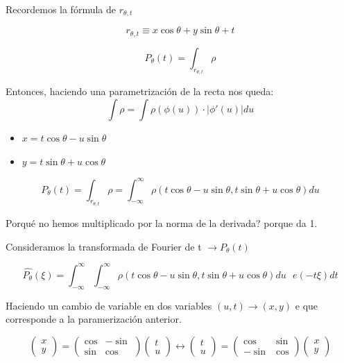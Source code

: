 Recordemos la fórmula de $r_{\theta,t}$

	$$r_{\theta , t} \equiv x \cos\theta + y\sin\theta + t$$

	$$P_{\theta} (t) = \int_{r_{\theta , t}} \rho $$

	Entonces, haciendo una parametrización de la recta nos queda:
	$$\int \rho = \int \rho (\phi(u)) \cdot |\phi '(u)| du$$
	\begin{itemize}
		\item $x = t\cos\theta - u \sin\theta$
		\item $y = t\sin\theta + u \cos\theta$
	\end{itemize}

	$$P_{\theta} (t) = \int_{r_{\theta , t}} \rho = \int_{-\infty}^{\infty} \rho ( t\cos\theta - u\sin\theta , t\sin\theta + u\cos\theta) du$$

	Porqué no hemos multiplicado por la norma de la derivada? porque da 1.

	Consideramos la transformada de Fourier de t $\rightarrow P_{\theta}(t)$

	$$\widehat{P_{\theta}}(\xi) = \int_{-\infty}^{\infty} \int_{-\infty}^{\infty} \rho ( t\cos\theta - u\sin\theta , t\sin\theta + u\cos\theta) du\text{  }e(-t\xi) dt $$

	Haciendo un cambio de variable en dos variables $(u,t) \rightarrow (x,y)$ e que corresponde a la paramerización anterior.

	$$\left(\begin{matrix}
		x\\
		y
	\end{matrix} \right) = \left( \begin{matrix}
	\cos & -\sin\\
	\sin & \cos
	\end{matrix}\right)\left(\begin{matrix}
	t\\
	u
	\end{matrix}\right) \longleftrightarrow \left(\begin{matrix}
	t\\
	u
	\end{matrix} \right) = \left( \begin{matrix}
	\cos & \sin\\
	-\sin & \cos
	\end{matrix}\right)\left(\begin{matrix}
	x\\
	y
	\end{matrix}\right)$$

